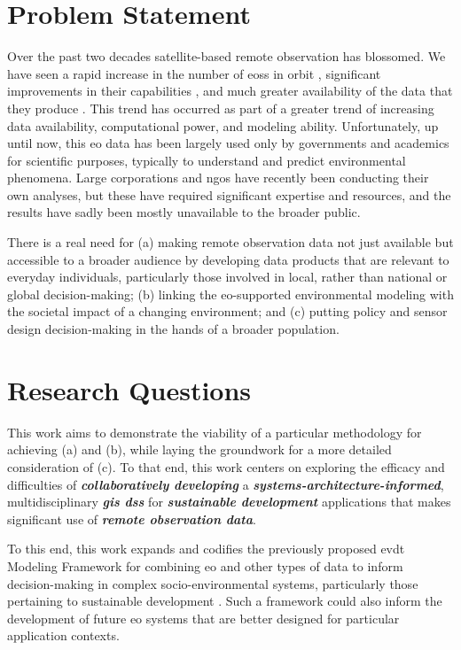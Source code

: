 \documentclass[notitlepage]{article}
\begin{document}
\newpage

\section{Problem Statement}

Over the past two decades satellite-based remote observation has blossomed. We have seen a rapid increase in the number of \acp{eos} in orbit \cite{belwardWhoLaunchedWhat2015}, significant improvements in their capabilities \cite{jensenRemoteSensingEnvironment2006}, and much greater availability of the data that they produce \cite{borowitzOpenSpaceGlobal2017}. This trend has occurred as part of a greater trend of increasing data availability, computational power, and modeling ability. Unfortunately, up until now, this \ac{eo} data has been largely used only by governments and academics for scientific purposes, typically to understand and predict environmental phenomena. Large corporations and \acp{ngo} have recently been conducting their own analyses, but these have required significant expertise and resources, and the results have sadly been mostly unavailable to the broader public. 

There is a real need for (a) making remote observation data not just available but accessible to a broader audience by developing data products that are relevant to everyday individuals, particularly those involved in local, rather than national or global decision-making; (b) linking the \ac{eo}-supported environmental modeling with the societal impact of a changing environment; and (c) putting policy and sensor design decision-making in the hands of a broader population. 

\section{Research Questions}

This work aims to demonstrate the viability of a particular methodology for achieving (a) and (b), while laying the groundwork for a more detailed consideration of (c). To that end, this work centers on exploring the efficacy and difficulties of \textbf{\textit{collaboratively developing}} a \textbf{\textit{systems-architecture-informed}}, multidisciplinary \textbf{\textit{\ac{gis} \ac{dss}}} for \textbf{\textit{sustainable development}} applications that makes significant use of \textbf{\textit{remote observation data}}.

To this end, this work expands and codifies the previously proposed \ac{evdt} Modeling Framework  for combining \ac{eo} and other types of data to inform decision-making in complex socio-environmental systems, particularly those pertaining to sustainable development \cite{reidCombiningSocialEnvironmental2019}. Such a framework could also inform the development of future \ac{eo} systems that are better designed for particular application contexts. 
\end{document}
